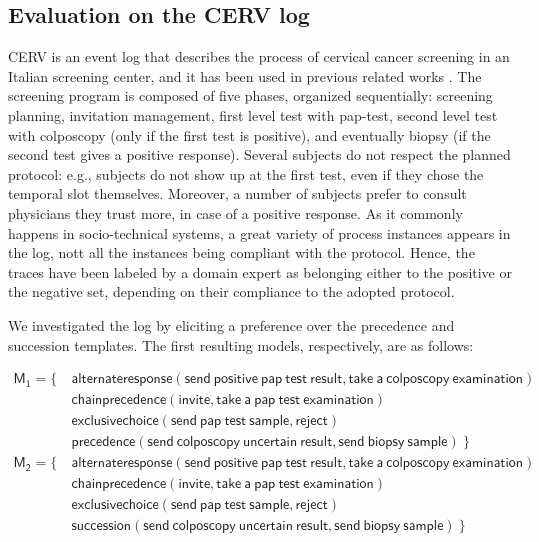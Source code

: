 \subsection{Evaluation on the CERV log}
\label{subsec:cerv}

CERV is an event log that describes the process of cervical cancer screening in an Italian screening center, and it has been used in previous related works \cite{2007b-Lamma,deviant-tkde}. The screening program is composed of five phases, organized sequentially: screening planning, invitation management, first level test with pap-test, second level test with colposcopy (only if the first test is positive), and eventually biopsy (if the second test gives a positive response). Several subjects do not respect the planned protocol: e.g., subjects do not show up at the first test, even if they chose the temporal slot themselves. Moreover, a number of subjects prefer to consult physicians they trust more, in case of a positive response. As it commonly happens in socio-technical systems, a great variety of process instances appears in the log, nott all the instances being compliant with the protocol.
%
Hence, the traces have been labeled by a domain expert as belonging either to the positive or the negative set, depending on their compliance to the adopted protocol.

We investigated the log by eliciting a preference over the \textsf{precedence} and \textsf{succession} templates. The first resulting models, respectively, are as follows:

\begin{align*}
\mathsf{M_1} = \{ \ &  \mathsf{ alternateresponse(send\ positive\ pap\ test\ result, take\ a\ colposcopy\ examination)} \\
& \mathsf{ chainprecedence(invite, take\ a\ pap\ test\ examination)} \\
& \mathsf{ exclusivechoice(send\ pap\ test\ sample, reject)} \\
& \mathsf{precedence(send\ colposcopy\ uncertain\ result, send\ biopsy\ sample)} \ \}  \\
\mathsf{M_2} = \{ \ &  \mathsf{ alternateresponse(send\ positive\ pap\ test\ result, take\ a\ colposcopy\ examination)} \\
& \mathsf{ chainprecedence(invite, take\ a\ pap\ test\ examination)} \\
& \mathsf{ exclusivechoice(send\ pap\ test\ sample, reject)} \\
& \mathsf{succession(send\ colposcopy\ uncertain\ result, send\ biopsy\ sample)} \ \}  
\end{align*}


